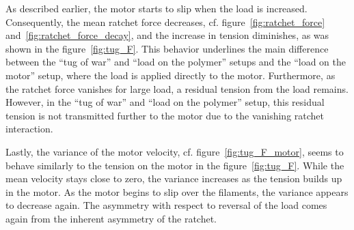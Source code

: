\documentclass[aps,pre,twocolumn,showpacs,showkeys,superscriptaddress,floatfix]{revtex4-1}
\begin{document}
As described earlier, the motor starts to slip when the load is increased.
Consequently, the mean ratchet force decreases, cf. figure~\ref{fig:ratchet_force} and~\ref{fig:ratchet_force_decay}, and the increase in tension diminishes, 
as was shown in the figure~\ref{fig:tug_F}.
This behavior underlines the main difference between the ``tug of war'' and ``load on the polymer'' setups and the ``load on the motor'' setup, 
where the load is applied directly to the motor. 
Furthermore, as the ratchet force vanishes for large load, a residual tension from the load remains.
However, in the ``tug of war'' and ``load on the polymer'' setup, this residual tension is not transmitted further to the motor due to the vanishing ratchet interaction.

Lastly, the variance of the motor velocity, cf. figure~\ref{fig:tug_F_motor}, seems to behave similarly to the tension on the motor in the figure~\ref{fig:tug_F}. 
While the mean velocity stays close to zero, the variance increases as the tension builds up in the motor. 
As the motor begins to slip over the filaments, the variance appears to decrease again.
The asymmetry with respect to reversal of the load comes again from the inherent asymmetry of the ratchet.
\end{document}
